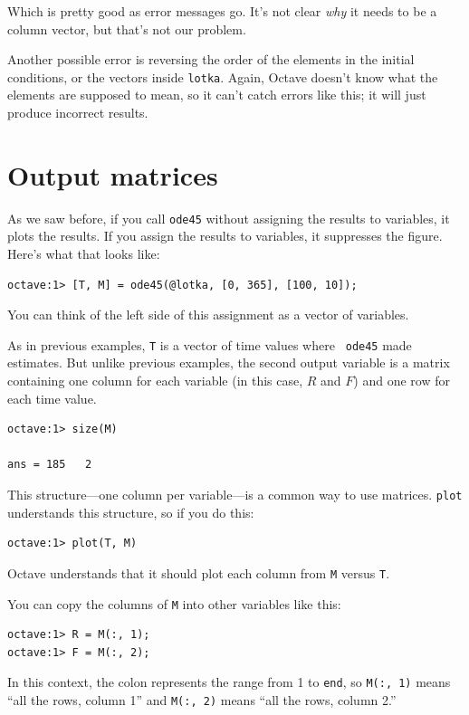 \documentclass{book}
\begin{document}
Which is pretty good as error messages go. It's not clear {\em why}
it needs to be a column vector, but that's not our problem.

Another possible error is reversing the order of the elements in the
initial conditions, or the vectors inside {\tt lotka}. Again, Octave
doesn't know what the elements are supposed to mean, so it can't catch
errors like this; it will just produce incorrect results.


\section{Output matrices}

As we saw before, if you call {\tt ode45} without assigning the
results to variables, it plots the results. 
If you assign
the results to variables, it suppresses the figure.
Here's what that looks like:

\begin{verbatim}
octave:1> [T, M] = ode45(@lotka, [0, 365], [100, 10]);
\end{verbatim}

You can think of the left side of this assignment as a vector
of variables.

As in previous examples, {\tt T} is a vector of time values where {\tt
ode45} made estimates. But unlike previous examples, the
second output variable is a matrix containing one column for each
variable (in this case, $R$ and $F$) and one row for each time value.

\begin{verbatim}
octave:1> size(M)

ans = 185   2
\end{verbatim}

This structure---one column per variable---is a common way to
use matrices. {\tt plot} understands this structure, so if you
do this:

\begin{verbatim}
octave:1> plot(T, M)
\end{verbatim}

Octave understands that it should plot each column from {\tt M}
versus {\tt T}.

You can copy the columns of {\tt M} into other variables like
this:

\begin{verbatim}
octave:1> R = M(:, 1);
octave:1> F = M(:, 2);
\end{verbatim}

In this context, the colon represents the range from 1 to {\tt end},
so {\tt M(:, 1)} means ``all the rows, column 1'' and
{\tt M(:, 2)} means ``all the rows, column 2.''
\end{document}
